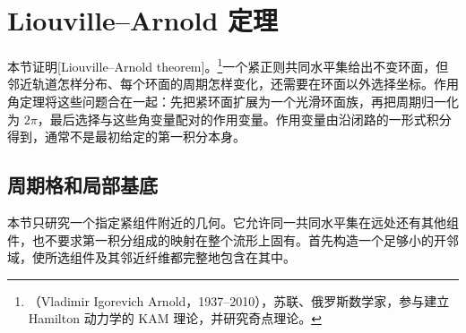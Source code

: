 
% 
% 

\section{Liouville–Arnold 定理}
\label{g4:sec:1102}

本节证明[Liouville--Arnold theorem]。\footnote{（Vladimir Igorevich Arnold，1937--2010），苏联、俄罗斯数学家，参与建立 Hamilton 动力学的 KAM 理论，并研究奇点理论。}一个紧正则共同水平集给出不变环面，但邻近轨道怎样分布、每个环面的周期怎样变化，还需要在环面以外选择坐标。作用角定理将这些问题合在一起：先把紧环面扩展为一个光滑环面族，再把周期归一化为 \(2\pi\)，最后选择与这些角变量配对的作用变量。作用变量由沿闭路的一形式积分得到，通常不是最初给定的第一积分本身。

\subsection{周期格和局部基底}
\label{g4:subsec:1102:01}

本节只研究一个指定紧组件附近的几何。它允许同一共同水平集在远处还有其他组件，也不要求第一积分组成的映射在整个流形上固有。首先构造一个足够小的开邻域，使所选组件及其邻近纤维都完整地包含在其中。

